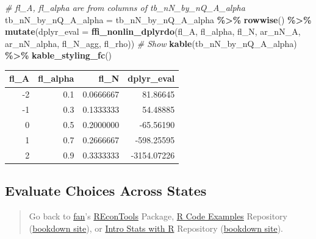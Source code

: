 \documentclass[
]{book}
\newenvironment{Shaded}{\begin{snugshade}}{\end{snugshade}}
\newcommand{\CommentTok}[1]{\textcolor[rgb]{0.56,0.35,0.01}{\textit{#1}}}
\newcommand{\DataTypeTok}[1]{\textcolor[rgb]{0.13,0.29,0.53}{#1}}
\newcommand{\KeywordTok}[1]{\textcolor[rgb]{0.13,0.29,0.53}{\textbf{#1}}}
\newcommand{\NormalTok}[1]{#1}
\newcommand{\OperatorTok}[1]{\textcolor[rgb]{0.81,0.36,0.00}{\textbf{#1}}}
\newcommand{\StringTok}[1]{\textcolor[rgb]{0.31,0.60,0.02}{#1}}
\begin{document}
\begin{Shaded}
\begin{Highlighting}[]
\CommentTok{\# fl\_A, fl\_alpha are from columns of tb\_nN\_by\_nQ\_A\_alpha}
\NormalTok{tb\_nN\_by\_nQ\_A\_alpha =}\StringTok{ }\NormalTok{tb\_nN\_by\_nQ\_A\_alpha }\OperatorTok{\%\textgreater{}\%}\StringTok{ }\KeywordTok{rowwise}\NormalTok{() }\OperatorTok{\%\textgreater{}\%}
\StringTok{                        }\KeywordTok{mutate}\NormalTok{(}\DataTypeTok{dplyr\_eval =} \KeywordTok{ffi\_nonlin\_dplyrdo}\NormalTok{(fl\_A, fl\_alpha, fl\_N,}
\NormalTok{                                                               ar\_nN\_A, ar\_nN\_alpha,}
\NormalTok{                                                               fl\_N\_agg, fl\_rho))}
\CommentTok{\# Show}
\KeywordTok{kable}\NormalTok{(tb\_nN\_by\_nQ\_A\_alpha) }\OperatorTok{\%\textgreater{}\%}
\StringTok{  }\KeywordTok{kable\_styling\_fc}\NormalTok{()}
\end{Highlighting}
\end{Shaded}

\begin{table}[!h]
\centering
\begin{tabular}{r|r|r|r}
\hline
fl\_A & fl\_alpha & fl\_N & dplyr\_eval\\
\hline
\rowcolor{gray!6}  -2 & 0.1 & 0.0666667 & 81.86645\\
\hline
-1 & 0.3 & 0.1333333 & 54.48885\\
\hline
\rowcolor{gray!6}  0 & 0.5 & 0.2000000 & -65.56190\\
\hline
1 & 0.7 & 0.2666667 & -598.25595\\
\hline
\rowcolor{gray!6}  2 & 0.9 & 0.3333333 & -3154.07226\\
\hline
\end{tabular}
\end{table}

\hypertarget{evaluate-choices-across-states}{%
\subsection{Evaluate Choices Across States}\label{evaluate-choices-across-states}}

\begin{quote}
Go back to \href{http://fanwangecon.github.io/}{fan}'s \href{https://fanwangecon.github.io/REconTools/}{REconTools} Package, \href{https://fanwangecon.github.io/R4Econ/}{R Code Examples} Repository (\href{https://fanwangecon.github.io/R4Econ/bookdown}{bookdown site}), or \href{https://fanwangecon.github.io/Stat4Econ/}{Intro Stats with R} Repository (\href{https://fanwangecon.github.io/Stat4Econ/bookdown}{bookdown site}).
\end{quote}
\end{document}
